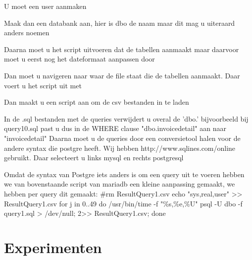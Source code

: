 \documentclass[fleqn,10pt]{artikeltin}
\begin{document}
U moet een user aanmaken
  \par

Maak dan een databank aan, hier is dbo de naam maar dit mag u uiteraard anders noemen
 \par

Daarna moet u het script uitvoeren dat de tabellen aanmaakt maar daarvoor moet u eerst nog het dateformaat 
aanpassen door 
 \par

Dan moet u navigeren naar waar de file staat die de tabellen aanmaakt.
Daar voert u het script uit met 
 \par

Dan maakt u een script aan om de csv bestanden in te laden
 \par
In de .sql bestanden met de queries verwijdert u overal de 'dbo.' bijvoorbeeld bij query10.sql past u dus in de WHERE clause "dbo.invoicedetail" aan naar "invoicedetail"
Daarna moet u de queries door een conversietool halen voor de andere syntax die postgre heeft. 
Wij hebben http://www.sqlines.com/online gebruikt. Daar selecteert u links mysql en rechts postgresql

Omdat de syntax van Postgre iets anders is om een query uit te voeren hebben we van bovenstaande script van mariadb een kleine aanpassing gemaakt, we hebben per query dit gemaakt:
\#rm ResultQuery1.csv
echo "sys,real,user" >> ResultQuery1.csv
for j in {0..49}
do
{ /usr/bin/time -f "\%s,\%e,\%U" psql -U dbo -f query1.sql > /dev/null; } 2>> ResultQuery1.csv;
done 

\section{Experimenten}
\label{sec:experimenten}
\end{document}
